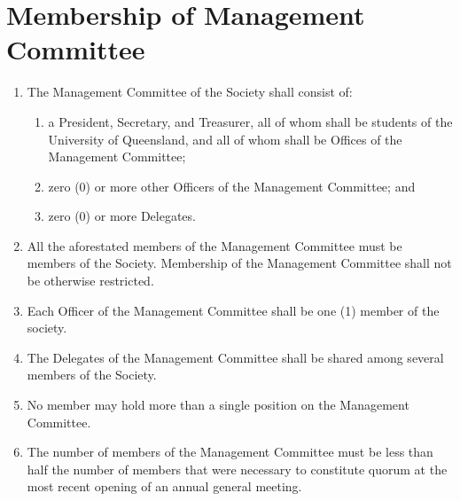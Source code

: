\documentclass[a4paper]{article}
\newcommand*{\sectionr}[1]{{\raggedright \section{#1}}}
\begin{document}
\sectionr{Membership of Management Committee}
\begin{enumerate}
\item The Management Committee of the Society shall consist of:
	\begin{enumerate}
	\item a President, Secretary, and Treasurer, all of whom shall be students of the University of Queensland, and all of whom shall be Offices of the Management Committee;
	\item zero (0) or more other Officers of the Management Committee; and
	\item zero (0) or more Delegates.
	\end{enumerate}
\item All the aforestated members of the Management Committee must be members of the Society. Membership of the Management Committee shall not be otherwise restricted.
\item Each Officer of the Management Committee shall be one (1) member of the society.
\item The Delegates of the Management Committee shall be shared among several members of the Society.
\item No member may hold more than a single position on the Management Committee.
\item The number of members of the Management Committee must be less than half the number of members that were necessary to constitute quorum at the most recent opening of an annual general meeting.
\end{enumerate}
\end{document}
